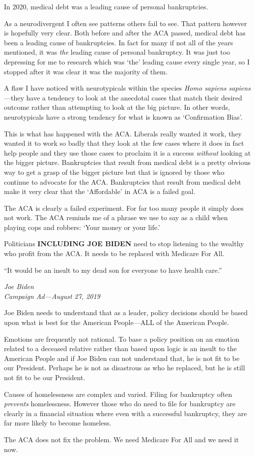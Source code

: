 In 2020, medical debt was a leading cause of personal bankruptcies.

\bigskip

As a neurodivergent I often see patterns others fail to see. That pattern however is hopefully very clear. Both before and after the ACA passed, medical debt has been a leading cause of bankruptcies. In fact for many if not all of the years mentioned, it was \emph{the} leading cause of personal bankruptcy. It was just too depressing for me to research which was `the' leading cause every single year, so I stopped after it was clear it was the majority of them.

A flaw I have noticed with neurotypicals within the species \textit{Homo sapiens sapiens}---they have a tendency to look at the anecdotal cases that match their desired outcome rather than attempting to look at the big picture. In other words, neurotypicals have a strong tendency for what is known as `Confirmation Bias'.

This is what has happened with the ACA. Liberals really wanted it work, they wanted it to work so badly that they look at the few cases where it does in fact help people and they use those cases to proclaim it is a success \emph{without} looking at the bigger picture. Bankruptcies that result from medical debt is a pretty obvious way to get a grasp of the bigger picture but that is ignored by those who continue to advocate for the ACA. Bankruptcies that result from medical debt make it very clear that the `Affordable' in ACA is a failed goal.

The ACA is clearly a failed experiment. For far too many people it simply does not work. The ACA reminds me of a phrase we use to say as a child when playing cops and robbers: `Your money or your life.'

Politicians \textbf{INCLUDING JOE BIDEN} need to stop listening to the wealthy who profit from the ACA. It needs to be replaced with Medicare For All.

\epigraph{``It would be an insult to my dead son for everyone to have health care.''}{\textit{Joe Biden \\ Campaign Ad---August 27, 2019}}

Joe Biden needs to understand that as a leader, policy decisions should be based upon what is best for the American People---ALL of the American People.

Emotions are frequently not rational. To base a policy position on an emotion related to a deceased relative rather than based upon logic is an insult to the American People and if Joe Biden can not understand that, he is not fit to be our President. Perhaps he is not as disastrous as who he replaced, but he is still not fit to be our President.

Causes of homelessness are complex and varied. Filing for bankruptcy often \emph{prevents} homelessness. However those who do need to file for bankruptcy are clearly in a financial situation where even with a successful bankruptcy, they are far more likely to become homeless.

The ACA does not fix the problem. We need Medicare For All and we need it now.
